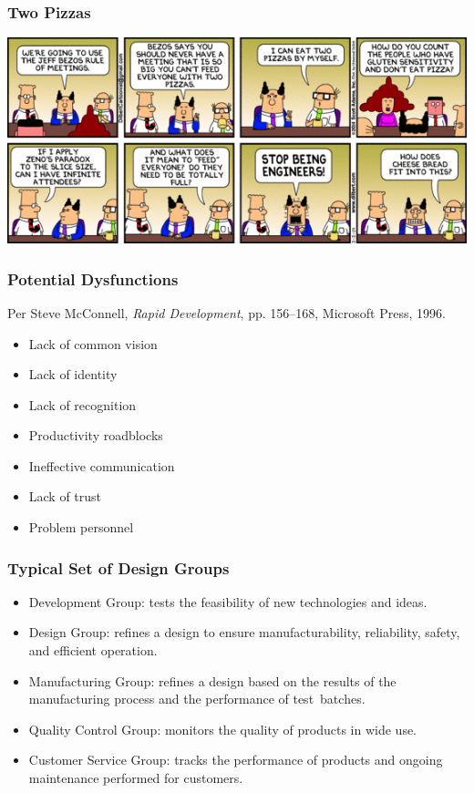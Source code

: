 \begin{frame}
\frametitle{Two Pizzas}
\begin{changemargin}{1cm}
\includegraphics[width=.8\textwidth]{images/twopizzas.png}
\end{changemargin}
\end{frame}



\begin{frame}

\frametitle{Potential Dysfunctions}

\begin{changemargin}{1cm}
Per Steve McConnell, \emph{Rapid Development}, 
pp. 156--168, Microsoft Press, 1996.
\begin{itemize}
\item Lack of common vision
\item Lack of identity
\item Lack of recognition
\item Productivity roadblocks
\item Ineffective communication
\item Lack of trust
\item Problem personnel
\end{itemize}
\end{changemargin}

\end{frame}

\begin{frame}

\frametitle{Typical Set of Design Groups}

\begin{changemargin}{2em}

\begin{itemize}
\item \alert{Development Group}: tests the feasibility of new technologies and ideas.
\item \alert{Design Group}: refines a design to ensure manufacturability, reliability, safety, and efficient operation.
\item \alert{Manufacturing Group}: refines a design based on the results of the manufacturing process and the performance of test~batches.
\item \alert{Quality Control Group}: monitors the quality of products in wide use.
\item \alert{Customer Service Group}: tracks the performance of products and ongoing maintenance performed for customers.
\end{itemize}
\end{changemargin}

\end{frame}

